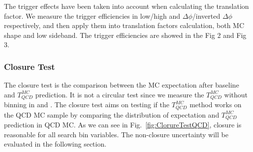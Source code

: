The trigger effects have been taken into account when calculating the translation factor. We measure the trigger efficiencies in low/high \HT and $\Delta\phi$/inverted $\Delta\phi$ respectively, and then apply them into translation factors calculation, both MC shape and low \MET sideband. The trigger efficiencies are showed in the Fig 2 and Fig 3.

\subsubsection{Closure Test}
The closure test is the comparison between the MC expectation after baseline and $T_{QCD}^{MC}$ prediction. It is not a circular test since we measure the $T_{QCD}^{MC}$ without binning in \ntops and \nbjets. 
The closure test aims on testing if the $T_{QCD}^{MC}$ method works on the QCD MC sample by comparing the distribution of expectation and $T_{QCD}^{MC}$ prediction in QCD MC.
As we can see in Fig.~\ref{fig:ClorureTestQCD}, closure is reasonable for all search bin variables. The non-closure uncertainty will be evaluated in the following section.
